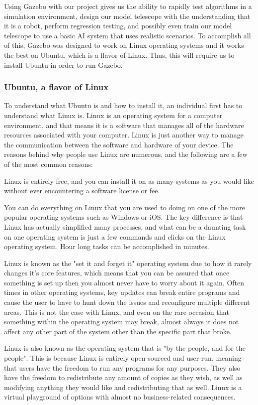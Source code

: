 \documentclass[12pt]{report}
\begin{document}
\newpage

Using Gazebo with our project gives us the ability to rapidly test algorithms in a simulation environment, design our model telescope with the understanding that it is a robot, perform regression testing, and possibly even train our model telescope to use a basic AI system that uses realistic scenarios. To accomplish all of this, Gazebo was designed to work on Linux operating systems and it works the best on Ubuntu, which is a flavor of Linux. Thus, this will require us to install Ubuntu in order to run Gazebo.

\subsubsection*{Ubuntu, a flavor of Linux}
To understand what Ubuntu is and how to install it, an individual first has to understand what Linux is. Linux is an operating system for a computer environment, and that means it is a software that manages all of the hardware resources associated with your computer. Linux is just another way to manage the communication between the software and hardware of your device.\cite{LinuxExplaination} The reasons behind why people use Linux are numerous, and the following are a few of the most common reasons:
\begin{description}[font=$\bullet$~\normalfont\scshape\color{red!50!black}]
	\item [Zero Cost of Entry] Linux is entirely free, and you can install it on as many systems as you would like without ever encountering a software license or fee.
	\item [Usability] You can do everything on Linux that you are used to doing on one of the more popular operating systems such as Windows or iOS. The key difference is that Linux has actually simplified many processes, and what can be a daunting task on one operating system is just a few commands and clicks on the Linux operating system. Hour long tasks can be accomplished in minutes.
	\item [System Administration] Linux is known as the "set it and forget it" operating system due to how it rarely changes it's core features, which means that you can be assured that once something is set up then you almost never have to worry about it again. Often times in other operating systems, key updates can break entire programs and cause the user to have to hunt down the issues and reconfigure multiple different areas. This is not the case with Linux, and even on the rare occasion that something within the operating system may break, almost always it does not affect any other part of the system other than the specific part that broke.
	\item [Open Source Licensing] Linux is also known as the operating system that is "by the people, and for the people". This is because Linux is entirely open-sourced and user-run, meaning that users have the freedom to run any programs for any purposes. They also have the freedom to redistribute any amount of copies as they wish, as well as modifying anything they would like and redistributing that as well. Linux is a virtual playground of options with almost no business-related consequences.
\end{description}
\end{document}
